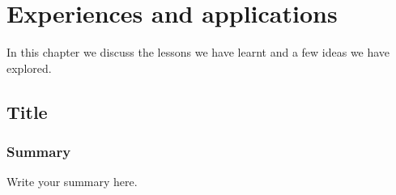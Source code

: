 \chapter{Experiences and applications}

In this chapter we discuss the lessons we
have learnt and a few ideas we have explored.

\section{Title}
\label{sec:quantified}


\subsection*{Summary}

Write your summary here.
